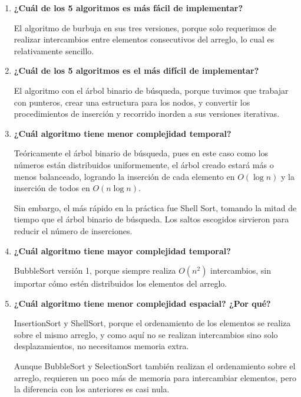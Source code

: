 \documentclass[12pt, fleqn]{report}                             %
\theoremstyle{break}                                            %
\begin{document}
	        \begin{enumerate}\setlength\itemsep{0em}
	            \item \textbf{¿Cuál de los 5 algoritmos es más fácil de implementar?}
	            
	                El algoritmo de burbuja en sus tres versiones, porque solo requerimos de realizar intercambios entre elementos consecutivos del arreglo, lo cual es relativamente sencillo.
	            
	            \item \textbf{¿Cuál de los 5 algoritmos es el más difícil de implementar?}
	            
	                El algoritmo con el árbol binario de búsqueda, porque tuvimos que trabajar con punteros, crear una estructura para los nodos, y convertir los procedimientos de inserción y recorrido inorden a sus versiones iterativas.
	            
	            \item \textbf{¿Cuál algoritmo tiene menor complejidad temporal?}
	            
	                Teóricamente el árbol binario de búsqueda, pues en este caso como los números están distribuidos uniformemente, el árbol creado estará más o menos balanceado, logrando la inserción de cada elemento en $O(\log n)$ y la inserción de todos en $O(n \log n)$.
	                
	                Sin embargo, el más rápido en la práctica fue Shell Sort, tomando la mitad de tiempo que el árbol binario de búsqueda. Los saltos escogidos sirvieron para reducir el número de inserciones.
	            
	            \item \textbf{¿Cuál algoritmo tiene mayor complejidad temporal?}
	            
	                BubbleSort versión 1, porque siempre realiza $O(n^2)$ intercambios, sin importar cómo estén distribuidos los elementos del arreglo.
	            
	            \item \textbf{¿Cuál algoritmo tiene menor complejidad espacial? ¿Por qué?}
	            
	                InsertionSort y ShellSort, porque el ordenamiento de los elementos se realiza sobre el mismo arreglo, y como aquí no se realizan intercambios sino solo desplazamientos, no necesitamos memoria extra.
	                
	                Aunque BubbleSort y SelectionSort también realizan el ordenamiento sobre el arreglo, requieren un poco más de memoria para intercambiar elementos, pero la diferencia con los anteriores es casi nula.
	            

\end{enumerate}
\end{document}
